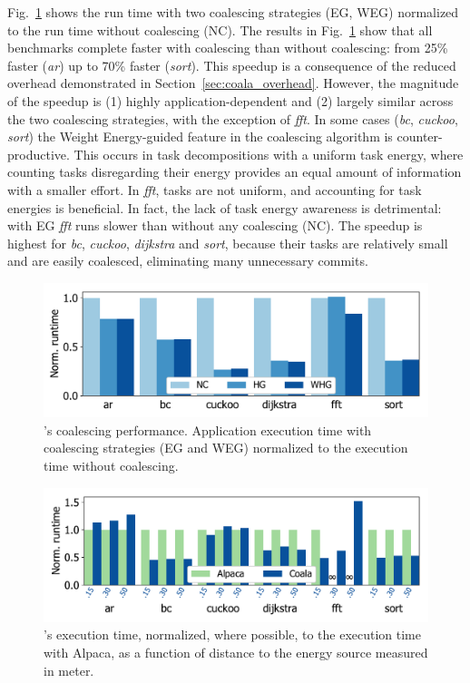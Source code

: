 Fig.~\ref{fig:coalescing} shows the \sys run time with two coalescing
strategies (EG, WEG) normalized to the run time without coalescing (NC).
%
The results in Fig.~\ref{fig:coalescing} show that all benchmarks
complete faster with coalescing than without coalescing: from 25\% faster
(\textit{ar}) up to 70\% faster (\textit{sort}).
%
This speedup is a consequence of the reduced overhead demonstrated in
Section~\ref{sec:coala_overhead}.
%
However, the magnitude of the speedup is (1) highly application-dependent and
(2) largely similar across the two coalescing strategies, with the exception of
\textit{fft}.
%
In some cases (\textit{bc}, \textit{cuckoo}, \textit{sort}) the Weight Energy-guided
feature in the coalescing algorithm is counter-productive.
%
This occurs in task decompositions with a uniform task energy, where counting
tasks disregarding their energy provides an equal amount of information with a
smaller effort.
%
In \textit{fft}, tasks are not uniform, and accounting for task energies is
beneficial. In fact, the lack of task energy awareness is detrimental: with EG
\textit{fft} runs slower than without any coalescing (NC).
%
The speedup is highest for \textit{bc}, \textit{cuckoo}, \textit{dijkstra} and
\textit{sort}, because their tasks are relatively small and are easily coalesced,
eliminating many unnecessary commits.
%
\begin{figure}
	\includegraphics[width=\columnwidth]{figures/coalStrategies}%
    \caption{\sys's coalescing performance.  Application execution time
with coalescing strategies (EG and WEG) normalized to the execution time
without coalescing.}
	\label{fig:coalescing}
\end{figure}

\begin{figure}
	\includegraphics[width=\columnwidth]{figures/coala_alpaca_gcc}
    \caption{\sys's execution time, normalized, where possible, to the execution time 
    with Alpaca, as a function of distance to the energy source 
    measured in meter.}
	\label{fig:runtime}
\end{figure}

